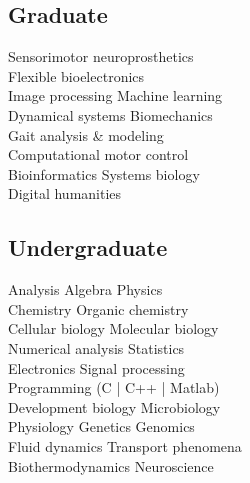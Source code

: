 \documentclass[a4paper]{cv}
\begin{document}
\hsepcol
\begin{minipage}[t]{0.33\textwidth}

\education

\coursework

\subsection{Graduate}
Sensorimotor neuroprosthetics\\
Flexible bioelectronics\\
Image processing \tbl{} Machine learning\\
Dynamical systems \tbl{} Biomechanics\\
Gait analysis \& modeling\\
Computational motor control\\
Bioinformatics \tbl{} Systems biology\\
Digital humanities
\sectionspace

\subsection{Undergraduate}
Analysis \tbl{} Algebra \tbl{} Physics\\
Chemistry \tbl{} Organic chemistry\\
Cellular biology \tbl{} Molecular biology\\
Numerical analysis \tbl{} Statistics\\
Electronics \tbl{} Signal processing\\
Programming (C | C++ | Matlab)\\
Development biology \tbl{} Microbiology\\
Physiology \tbl{} Genetics \tbl{} Genomics\\
Fluid dynamics \tbl{} Transport phenomena\\
Biothermodynamics \tbl{} Neuroscience
\sectionspace

\languages

\hobbies

\end{minipage}
\publications
\end{document}
